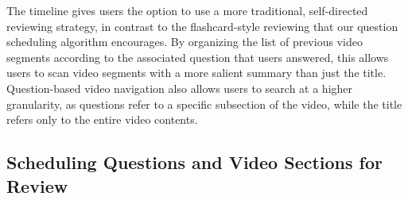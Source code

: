 \documentclass{sigchi}
\begin{document}


The timeline gives users the option to use a more traditional, self-directed reviewing strategy, in contrast to the flashcard-style reviewing that our question scheduling algorithm encourages. By organizing the list of previous video segments according to the associated question that users answered, this allows users to scan video segments with a more salient summary than just the title. Question-based video navigation also allows users to search at a higher granularity, as questions refer to a specific subsection of the video, while the title refers only to the entire video contents. %

\subsection{Scheduling Questions and Video Sections for Review}
\end{document}
